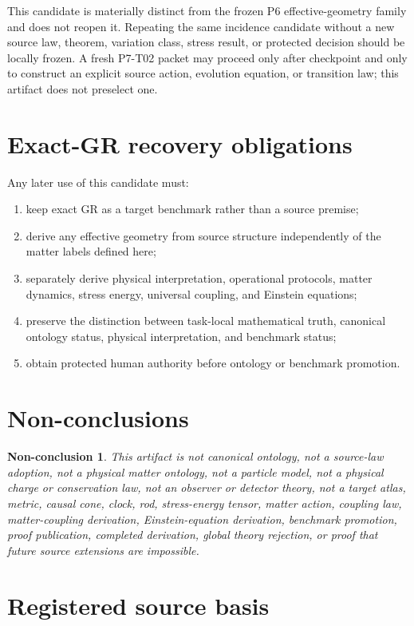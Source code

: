 \documentclass[11pt]{article}
\newtheorem{nonconclusion}{Non-conclusion}
\begin{document}
This candidate is materially distinct from the frozen P6 effective-geometry
family and does not reopen it. Repeating the same incidence candidate without
a new source law, theorem, variation class, stress result, or protected
decision should be locally frozen. A fresh P7-T02 packet may proceed only
after checkpoint and only to construct an explicit source action, evolution
equation, or transition law; this artifact does not preselect one.

\section{Exact-GR recovery obligations}

Any later use of this candidate must:
\begin{enumerate}[leftmargin=*]
\item keep exact GR as a target benchmark rather than a source premise;
\item derive any effective geometry from source structure independently of
  the matter labels defined here;
\item separately derive physical interpretation, operational protocols,
  matter dynamics, stress energy, universal coupling, and Einstein equations;
\item preserve the distinction between task-local mathematical truth,
  canonical ontology status, physical interpretation, and benchmark status;
\item obtain protected human authority before ontology or benchmark
  promotion.
\end{enumerate}

\section{Non-conclusions}

\begin{nonconclusion}
This artifact is not canonical ontology, not a source-law adoption, not a
physical matter ontology, not a particle model, not a physical charge or
conservation law, not an observer or detector theory, not a target atlas,
metric, causal cone, clock, rod, stress-energy tensor, matter action, coupling
law, matter-coupling derivation, Einstein-equation derivation, benchmark
promotion, proof publication, completed derivation, global theory rejection,
or proof that future source extensions are impossible.
\end{nonconclusion}

\section*{Registered source basis}
\end{document}
